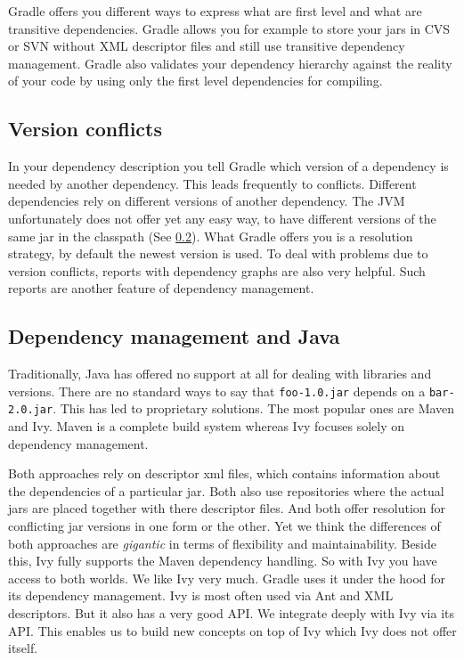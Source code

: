 Gradle offers you different ways to express what are first level and what are transitive dependencies. Gradle allows you for example to store your jars in CVS or SVN without XML descriptor files and still use transitive dependency management. Gradle also validates your dependency hierarchy against the reality of your code by using only the first level dependencies for compiling.

\subsection{Version conflicts} %
\label{sub:version_conflicts}
In your dependency description you tell Gradle which version of a dependency is needed by another dependency. This leads frequently to conflicts. Different dependencies rely on different versions of another dependency. The JVM unfortunately does not offer yet any easy way, to have different versions of the same jar in the classpath (See \ref{sub:dependency_management_and_java}). What Gradle offers you is a resolution strategy, by default the newest version is used. To deal with problems due to version conflicts, reports with dependency graphs are also very helpful. Such reports are another feature of dependency management.

\subsection{Dependency management and Java} %
\label{sub:dependency_management_and_java}
Traditionally, Java has offered no support at all for dealing with libraries and versions. There are no standard ways to say that \texttt{foo-1.0.jar} depends on a \texttt{bar-2.0.jar}. This has led to proprietary solutions. The most popular ones are Maven and Ivy. Maven is a complete build system whereas Ivy focuses solely on dependency management.

Both approaches rely on descriptor xml files, which contains information about the dependencies of a particular jar. Both also use repositories where the actual jars are placed together with there descriptor files. And both offer resolution for conflicting jar versions in one form or the other. Yet we think the differences of both approaches are \emph{gigantic} in terms of flexibility and maintainability. Beside this, Ivy fully supports the Maven dependency handling. So with Ivy you have access to both worlds. We like Ivy very much. Gradle uses it under the hood for its dependency management. Ivy is most often used via Ant and XML descriptors. But it also has a very good API. We integrate deeply with Ivy via its API. This enables us to build new concepts on top of Ivy which Ivy does not offer itself. 

